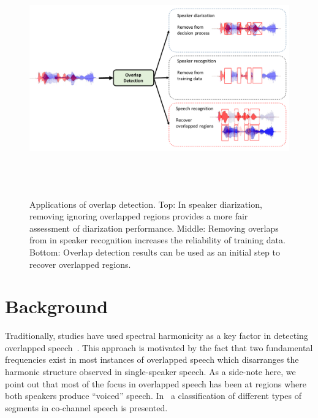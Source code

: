 \begin{figure}[h!]
	\centering
	\vspace{0mm}
	\includegraphics[height = 4in, width=1\textwidth]{figures/overlap_detection_applications}
	\vspace{-3mm}
	\caption{ Applications of overlap detection. Top: In speaker diarization, removing ignoring overlapped regions provides a more fair assessment of diarization performance. Middle: Removing overlaps from in speaker recognition increases the reliability of training data. Bottom: Overlap detection results can be used as an initial step to recover overlapped regions.}
	\label{fig:ch2_overlap_applications}
	\vspace{-3mm}
\end{figure}


\newpage
\section{Background}
\label{sec:ch2_methods}

Traditionally, studies have used spectral harmonicity as a key factor in detecting overlapped speech~\cite{nav_icassp13,smolenski_tut}. 
This approach is motivated by the fact that two fundamental frequencies exist in most instances of overlapped speech which disarranges the harmonic structure observed in single-speaker speech. 
As a side-note here, we point out that most of the focus in overlapped speech has been at regions where both speakers produce ``voiced'' speech. In~\cite{morgan_cochannel} a classification of different types of segments in co-channel speech is presented.

